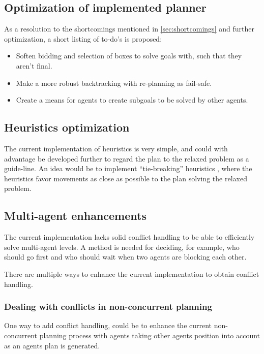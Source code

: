 \documentclass[Main]{subfiles}
\begin{document}
\subsection{Optimization of implemented planner}

As a resolution to the shortcomings mentioned in \autoref{sec:shortcomings} and further optimization, a short listing of to-do's is proposed:
\begin{itemize}
    \item Soften bidding and selection of boxes to solve goals with, such that they aren't final.
    \item Make a more robust backtracking with re-planning as fail-safe.
    \item Create a means for agents to create subgoals to be solved by other agents.
\end{itemize}



\subsection{Heuristics optimization}
The current implementation of heuristics is very simple, and could with advantage be developed further to regard the plan to the relaxed problem as a guide-line. An idea would be to implement ``tie-breaking'' heuristics \citep{stanford2015}, where the heuristics favor movements as close as possible to the plan solving the relaxed problem. 


\subsection{Multi-agent enhancements}

The current implementation lacks solid conflict handling to be able to efficiently solve multi-agent levels.
A method is needed for deciding, for example, who should go first and who should wait when two agents are blocking each other.

There are multiple ways to enhance the current implementation to obtain conflict handling.


\subsubsection{Dealing with conflicts in non-concurrent planning}

One way to add conflict handling, could be to enhance the current non-concurrent planning process with agents taking other agents position into account as an agents plan is generated.
\end{document}
